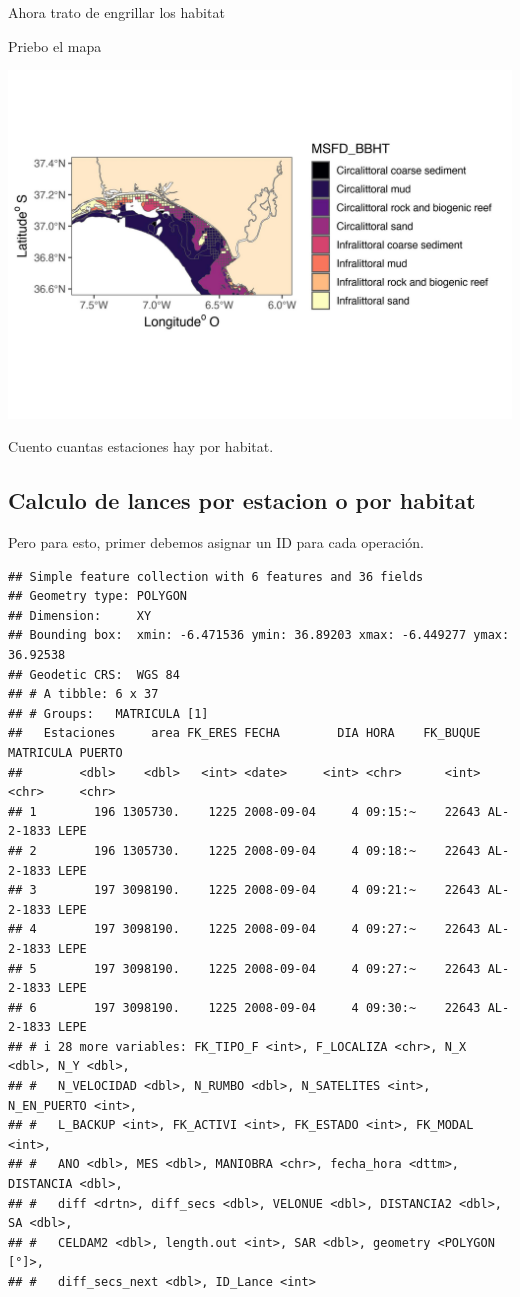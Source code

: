 \documentclass[
]{article}
\begin{document}
Ahora trato de engrillar los habitat

Priebo el mapa

\begin{center}\includegraphics{SAR_Method_files/figure-latex/unnamed-chunk-19-1} \end{center}

Cuento cuantas estaciones hay por habitat.

\hypertarget{calculo-de-lances-por-estacion-o-por-habitat}{%
\subsection{Calculo de lances por estacion o por habitat}\label{calculo-de-lances-por-estacion-o-por-habitat}}

Pero para esto, primer debemos asignar un ID para cada operación.

\begin{verbatim}
## Simple feature collection with 6 features and 36 fields
## Geometry type: POLYGON
## Dimension:     XY
## Bounding box:  xmin: -6.471536 ymin: 36.89203 xmax: -6.449277 ymax: 36.92538
## Geodetic CRS:  WGS 84
## # A tibble: 6 x 37
## # Groups:   MATRICULA [1]
##   Estaciones     area FK_ERES FECHA        DIA HORA    FK_BUQUE MATRICULA PUERTO
##        <dbl>    <dbl>   <int> <date>     <int> <chr>      <int> <chr>     <chr> 
## 1        196 1305730.    1225 2008-09-04     4 09:15:~    22643 AL-2-1833 LEPE  
## 2        196 1305730.    1225 2008-09-04     4 09:18:~    22643 AL-2-1833 LEPE  
## 3        197 3098190.    1225 2008-09-04     4 09:21:~    22643 AL-2-1833 LEPE  
## 4        197 3098190.    1225 2008-09-04     4 09:27:~    22643 AL-2-1833 LEPE  
## 5        197 3098190.    1225 2008-09-04     4 09:27:~    22643 AL-2-1833 LEPE  
## 6        197 3098190.    1225 2008-09-04     4 09:30:~    22643 AL-2-1833 LEPE  
## # i 28 more variables: FK_TIPO_F <int>, F_LOCALIZA <chr>, N_X <dbl>, N_Y <dbl>,
## #   N_VELOCIDAD <dbl>, N_RUMBO <dbl>, N_SATELITES <int>, N_EN_PUERTO <int>,
## #   L_BACKUP <int>, FK_ACTIVI <int>, FK_ESTADO <int>, FK_MODAL <int>,
## #   ANO <dbl>, MES <dbl>, MANIOBRA <chr>, fecha_hora <dttm>, DISTANCIA <dbl>,
## #   diff <drtn>, diff_secs <dbl>, VELONUE <dbl>, DISTANCIA2 <dbl>, SA <dbl>,
## #   CELDAM2 <dbl>, length.out <int>, SAR <dbl>, geometry <POLYGON [°]>,
## #   diff_secs_next <dbl>, ID_Lance <int>
\end{verbatim}
\end{document}
